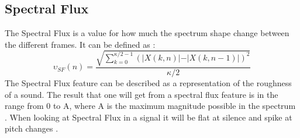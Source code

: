 \subsection{Spectral Flux}
The Spectral Flux is a value for how much the spectrum shape change between the different frames. It can be defined as \citep{ACA}:
\begin{equation}\label{Spectral Flux eq}
	\upsilon_{SF}(n) = \frac{\sqrt{\displaystyle\sum_{k=0}^{\kappa/2-1}(\vert X(k,n)\vert-\vert X(k,n-1)\vert)^2}}{\kappa/2}
\end{equation} 
The Spectral Flux feature can be described as a representation of the roughness of a sound. The result that one will get from a spectral flux feature is in the range from 0 to A, where A is the maximum magnitude possible in the spectrum \citep{ACA}. When looking at Spectral Flux in a signal it will be flat at silence and spike at pitch changes \citep{ACA}.
